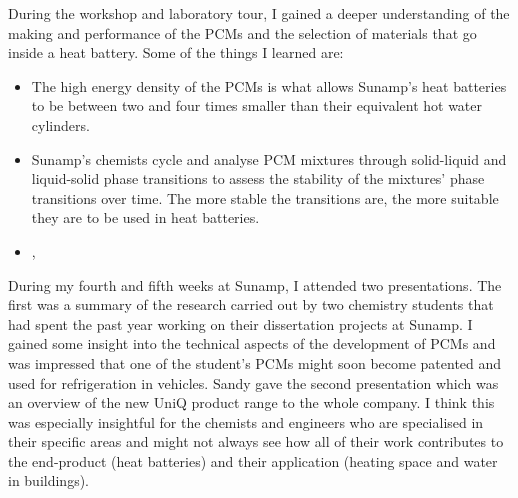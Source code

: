 During the workshop and laboratory tour, I gained a deeper understanding of the making and performance of the PCMs and the selection of materials that go inside a heat battery.
Some of the things I learned are:
\begin{itemize}
    \item The high energy density of the PCMs is what allows Sunamp's heat batteries to be between two and four times smaller than their equivalent hot water cylinders.
    \item Sunamp's chemists cycle and analyse PCM mixtures through solid-liquid and liquid-solid phase transitions to assess the stability of the mixtures' phase transitions over time. The more stable the transitions are, the more suitable they are to be used in heat batteries.
    \item {} \citep{Sommers2010}, 
\end{itemize}

During my fourth and fifth weeks at Sunamp, I attended two presentations.
The first was a summary of the research carried out by two chemistry students that had spent the past year working on their dissertation projects at Sunamp.
I gained some insight into the technical aspects of the development of PCMs and was impressed that one of the student's PCMs might soon become patented and used for refrigeration in vehicles.
Sandy gave the second presentation which was an overview of the new UniQ product range to the whole company.
I think this was especially insightful for the chemists and engineers who are specialised in their specific areas and might not always see how all of their work contributes to the end-product (heat batteries) and their application (heating space and water in buildings).


